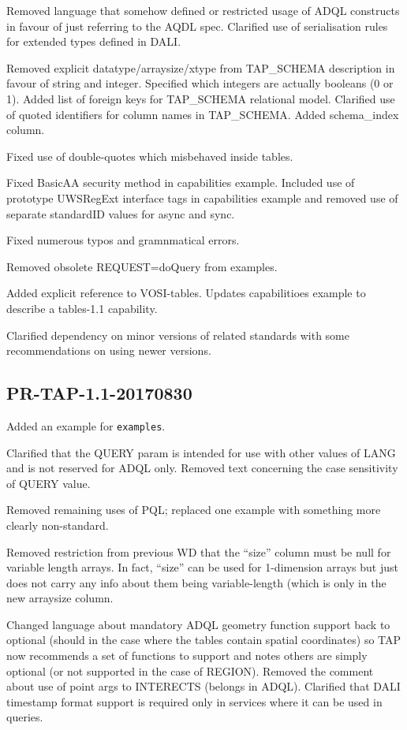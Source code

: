 \documentclass[11pt,letter]{ivoa}
\newcommand{\tapschema}{TAP\_SCHEMA}
\newcommand{\tapschema}{{%
  \relsize{-0.5}TAP\discretionary{-}{}{\kern-2pt\_}SCHEMA}}
\begin{document}
Removed language that somehow defined or restricted usage of ADQL constructs in
favour of just referring to the AQDL spec. Clarified use of serialisation
rules for extended types defined in DALI.

Removed explicit datatype/arraysize/xtype from \tapschema{} description
in favour of string and integer. Specified which integers are actually
booleans (0 or 1). Added list of foreign keys for \tapschema{}
relational model. Clarified use of quoted identifiers for column names in 
\tapschema. Added schema\_index column.

Fixed use of double-quotes which misbehaved inside tables. 

Fixed BasicAA security method in capabilities example. Included use of prototype
UWSRegExt interface tags in capabilities example and removed use of separate
standardID values for async and sync.

Fixed numerous typos and gramnmatical errors.

Removed obsolete REQUEST=doQuery from examples.

Added explicit reference to VOSI-tables. Updates capabilitioes example to describe a
tables-1.1 capability.

Clarified dependency on minor versions of related standards with some recommendations on
using newer versions.

\subsection{PR-TAP-1.1-20170830}

Added an example for \verb|examples|.

Clarified that the QUERY param is intended for use with other values of LANG and is not
reserved for ADQL only. Removed text concerning the case sensitivity of QUERY value.

Removed remaining uses of PQL; replaced one example with something more clearly non-standard.

Removed restriction from previous WD that the ``size'' column must be null for variable length arrays. In fact, ``size'' can be used for 1-dimension arrays but just does not carry any info about them being variable-length (which is only in the new arraysize column.

Changed language about mandatory ADQL geometry function support back to optional (should in
the case where the tables contain spatial coordinates) so TAP now recommends a set of functions to support and notes others are simply optional (or not supported in the case of REGION). Removed the comment about use of point args to INTERECTS (belongs in ADQL). Clarified that DALI timestamp format support is required only in services where it can be used in queries.
\end{document}
